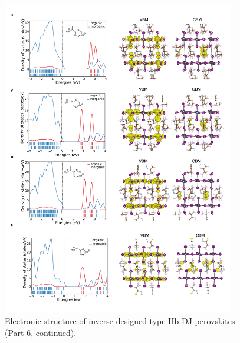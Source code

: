 \begin{figure}[htbp]
    \ContinuedFloat
    \centering
    \includegraphics[width=0.9\textwidth]{figures/synthesis-feasibility/figure5-25-6.png}
    \caption{Electronic structure of inverse-designed type IIb DJ perovskites (Part 6, continued).}
\end{figure}

